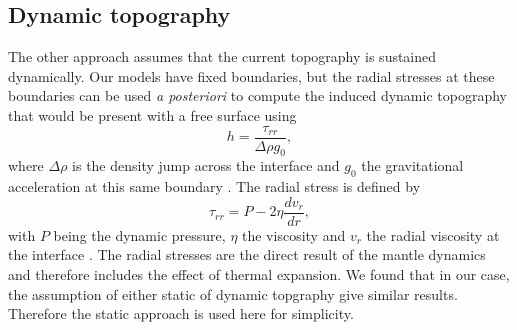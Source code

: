 \subsection*{Dynamic topography}

The other approach assumes that the current topography is sustained dynamically. Our models
have fixed boundaries, but the radial stresses at these boundaries can be used \emph{a
posteriori} to compute the induced dynamic topography that would be present with a free surface
using
%
\begin{equation} h = \frac{\tau_{rr}}{\Delta \rho g_0}, \end{equation}
%
where $\Delta \rho$ is the density jump across the interface and $g_0$ the gravitational
acceleration at this same boundary \citep{Peltier:1989ft}. The radial stress is defined by
%
\begin{equation} \tau_{rr} = P - 2\eta \frac{dv_r}{dr}, \end{equation}
%
with $P$ being the dynamic pressure, $\eta$ the viscosity and $v_r$ the radial viscosity at the
interface \citep{Landau:1959vb}. The radial stresses are the direct result of the mantle dynamics
and therefore includes the effect of thermal expansion. We found that in our case, the assumption of
either static of dynamic topgraphy give similar results. Therefore the static approach is used here
for simplicity.


